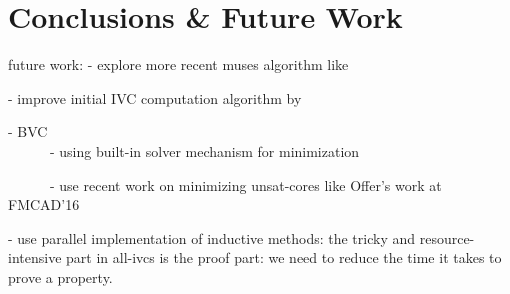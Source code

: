 \section{Conclusions \& Future Work}
\label{sec:conc}

 future work:
 - explore more recent muses algorithm like \cite{Bacchus2016}

 - improve initial IVC computation algorithm by
 
 - BVC\\

~~~~~~- using built-in solver mechanism for minimization

~~~~~~- use recent work on minimizing unsat-cores like Offer's work at FMCAD'16

 - use parallel implementation of inductive methods:
 the tricky and resource-intensive part in all-ivcs is the proof part: we need to reduce the time it takes to prove a property. 